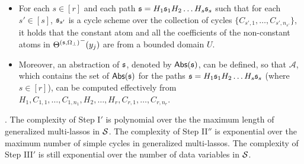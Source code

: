 \begin{itemize}
\item For each $s \in [r]$ and each path ${\mathfrak{s} }=H_1 {\mathfrak{s} }_1 H_2 \dots H_s {\mathfrak{s} }_s$ such that for each $s'\in [s]$, ${\mathfrak{s} }_{s'}$ is a cycle scheme over the collection of cycles $\{C_{s',1},\dots,C_{s',n_{s'}}\}$, it holds that the constant atom and all the coefficients of the non-constant atoms in ${\Theta^{({\mathfrak{s} },\Omega_\bot)}}^-(y_j)$ are from a bounded domain $U$.
%
\item Moreover,  an abstraction of ${\mathfrak{s} }$, denoted by $\mathsf{Abs}({\mathfrak{s} })$, can be defined, so that $\mathscr{A}$, which contains the set of $\mathsf{Abs}({\mathfrak{s} })$ for the paths ${\mathfrak{s} }=H_1 {\mathfrak{s} }_1 H_2 \dots H_s {\mathfrak{s} }_s$ (where $s \in [r]$), can be computed effectively from 
$H_1, C_{1,1}, \dots, C_{1,n_1},H_2,\dots, H_r,C_{r,1},\dots, C_{r,n_r}$.
\end{itemize}
\bigskip

. The complexity of Step I$'$ is polynomial over the the maximum length of generalized multi-lassos in ${\mathcal{S} }$. The complexity of Step II$''$ is exponential over the maximum number of simple cycles in generalized multi-lassos. The complexity of Step III$'$ is still exponential over the number of data variables in ${\mathcal{S} }$.

